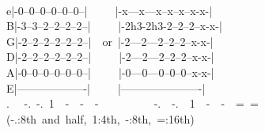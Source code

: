{\\
e|-0--0--0--0--0--0--|\ \ \ \ \ |-x---x---x--x--x--x-x-|\\
B|-3--3--2--2--2--2--|\ \ \ \ \ |-2h3-2h3-2--2--2--x-x-|\\
G|-2--2--2--2--2--2--|\ \ or\ |-2---2---2--2--2--x-x-|\\
D|-2--2--2--2--2--2--|\ \ \ \ \ |-2---2---2--2--2--x-x-|\\
A|-0--0--0--0--0--0--|\ \ \ \ \ |-0---0---0--0--0--x-x-|\\
E|-------------------|\ \ \ \ \ |----------------------|\\
. \ \ -.\ -.\ 1\ \ -\ \ -\ \ -\ \ \ \ \ \ \ \ \ \ -.\ \ -.\ \ 1\ \ -\ \ -\ \ =\ =\ \ \ \\
(-.:8th\ and\ half,\ 1:4th,\ -:8th,\ =:16th)\ \ }

